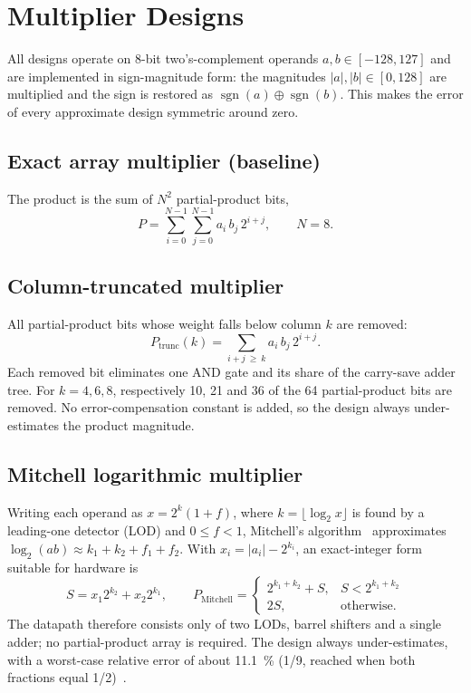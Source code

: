 \documentclass[11pt,a4paper]{article}
\begin{document}
\section{Multiplier Designs}
All designs operate on 8-bit two's-complement operands
$a,b\in[-128,127]$ and are implemented in sign-magnitude form: the magnitudes
$|a|,|b|\in[0,128]$ are multiplied and the sign is restored as
$\operatorname{sgn}(a)\oplus\operatorname{sgn}(b)$. This makes the error of
every approximate design symmetric around zero.

\subsection{Exact array multiplier (baseline)}
The product is the sum of $N^2$ partial-product bits,
\begin{equation}
  P = \sum_{i=0}^{N-1}\sum_{j=0}^{N-1} a_i\, b_j\, 2^{i+j}, \qquad N = 8 .
\end{equation}

\subsection{Column-truncated multiplier}
All partial-product bits whose weight falls below column $k$ are removed:
\begin{equation}
  P_{\text{trunc}}(k) = \sum_{i+j\ \ge\ k} a_i\, b_j\, 2^{i+j}.
\end{equation}
Each removed bit eliminates one AND gate and its share of the
carry-save adder tree. For $k=4,6,8$, respectively 10, 21 and 36 of the 64
partial-product bits are removed. No error-compensation constant is added, so
the design always under-estimates the product magnitude.

\subsection{Mitchell logarithmic multiplier}
Writing each operand as $x = 2^{k}(1+f)$, where $k=\lfloor\log_2 x\rfloor$ is
found by a leading-one detector (LOD) and $0\le f<1$, Mitchell's
algorithm~\cite{mitchell1962} approximates
$\log_2(ab)\approx k_1+k_2+f_1+f_2$. With $x_i = |a_i| - 2^{k_i}$, an
exact-integer form suitable for hardware is
\begin{equation}
  S = x_1 2^{k_2} + x_2 2^{k_1},\qquad
  P_{\text{Mitchell}} =
  \begin{cases}
    2^{k_1+k_2} + S, & S < 2^{k_1+k_2}\\
    2S,              & \text{otherwise.}
  \end{cases}
\end{equation}
The datapath therefore consists only of two LODs, barrel shifters and a
single adder; no partial-product array is required. The design always
under-estimates, with a worst-case relative error of about \SI{11.1}{\percent}
(1/9, reached when both fractions equal 1/2)~\cite{mitchell1962}.
\end{document}
